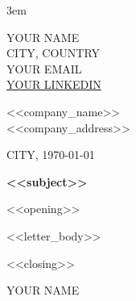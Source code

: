 \documentclass[11pt,a4paper]{article}
\begin{document}
\emergencystretch 3em


\begin{flushright}
YOUR NAME\\
CITY, COUNTRY\\
YOUR EMAIL\\
\href{https://linkedin.com/in/YOUR_LINKEDIN}{YOUR LINKEDIN}
\end{flushright}

<<company_name>>\\
<<company_address>>

\begin{flushright}
CITY, \today
\end{flushright}

\vspace{1em}

\textbf{<<subject>>}

\vspace{1em}
<<opening>>

\vspace{1em}

<<letter_body>>

\vspace{1em}

<<closing>>

\vspace{1em}

YOUR NAME
\end{document}
